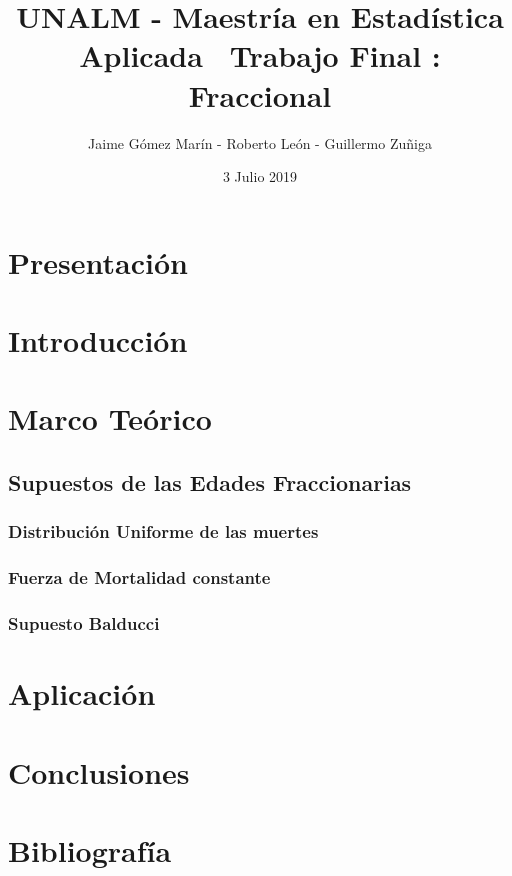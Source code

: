 \documentclass{report}
\title{UNALM - Maestr\'ia en Estad\'istica Aplicada \ Trabajo Final : Fraccional}
\author{Jaime G\'omez Mar\'in - Roberto Le\'on - Guillermo Zu\~niga}
\date{3 Julio 2019}
\begin{document}
\maketitle
\tableofcontents  



\chapter{Presentaci\'on}

\chapter{Introducci\'on}

\chapter{Marco Te\'orico}

\section{Supuestos de las Edades Fraccionarias}

\subsection{Distribuci\'on Uniforme de las muertes}
\subsection{Fuerza de Mortalidad constante}


\subsection{Supuesto Balducci}

\chapter{Aplicaci\'on}

\chapter{Conclusiones}

\chapter{ Bibliograf\'ia}
\end{document}
